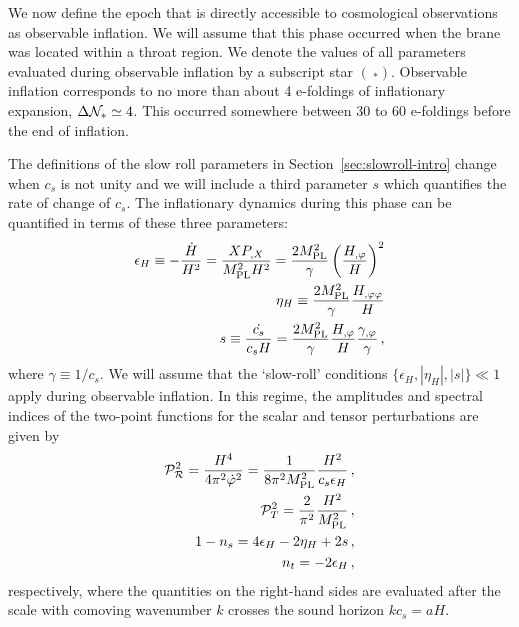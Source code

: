 We now define the epoch that is directly 
accessible to cosmological observations as observable inflation. 
We will assume that this phase 
occurred when the brane was located within a 
throat region. We denote the values of all parameters 
evaluated during observable inflation by a subscript star
$(~_*)$. Observable inflation corresponds to no more than about 4 e-foldings  
of inflationary expansion, $\Delta \mathcal{N}_* \simeq 4$. 
This occurred somewhere between 30 to 60 e-foldings before the
end of inflation. 


The definitions of the slow roll parameters in Section~\ref{sec:slowroll-intro} 
change when $c_s$ is not unity and we
will include a third parameter $s$ which quantifies the rate of change of $c_s$.
The inflationary dynamics during this phase can  
be quantified in terms of these three parameters: 
% 
\begin{eqnarray}
\label{eq:epsdefn-dbiintro}
\epsilon_H \equiv -\frac{\dot{H}}{H^2}
= \frac{XP_{,X}}{M_{\mathrm{PL}}^2H^2} 
= \frac{2M_{\mathrm{PL}}^2}{\gamma} \left( \frac{H_{,\varphi}}{H} \right)^2 \\
\label{eq:defeta-dbiintro}
\eta_H \equiv  \frac{2M_{\mathrm{PL}}^2}{\gamma}\frac{H_{,\varphi\varphi}}{H} \\
\label{eq:defs-dbiintro}
s \equiv \frac{\dot{c_s}}{c_sH} 
= \frac{2M_{\mathrm{PL}}^2}{\gamma} \frac{H_{,\varphi}}{H}\frac{\gamma_{,\varphi}}{\gamma}  \,,
\end{eqnarray}
% 
where $\gamma \equiv 1/c_s$. 
We will assume that the `slow-roll' conditions 
$\{ \epsilon_H, |\eta_H | , |s | \}  \ll 1$ apply during observable inflation. 
In this regime, the amplitudes and spectral indices of the two-point functions 
for the scalar and tensor perturbations are given by \cite{gm}
% 
\begin{eqnarray}
\label{eq:spectra-dbiintro}
\mathcal{P}_{\mathcal{R}}^2 = \frac{H^4}{4\pi^2\dot{\varphi}^2} =\frac{1}{8 \pi^2 M_{\mathrm{PL}}^2}
\frac{H^2}{c_s \epsilon_H}\,,
\\
\mathcal{P}_T^2 = \frac{2}{\pi^2} \frac{H^2}{M_{\mathrm{PL}}^2} \,,
\\
\label{indices}
1-n_s = 4 \epsilon_H -2\eta_H  +2s \,,
\\
 n_t = -2\epsilon_H  \,,
\end{eqnarray}
% 
respectively, where the quantities on the right-hand sides are evaluated 
after the scale with comoving wavenumber $k$ crosses 
the sound horizon $k c_s = aH$.  



